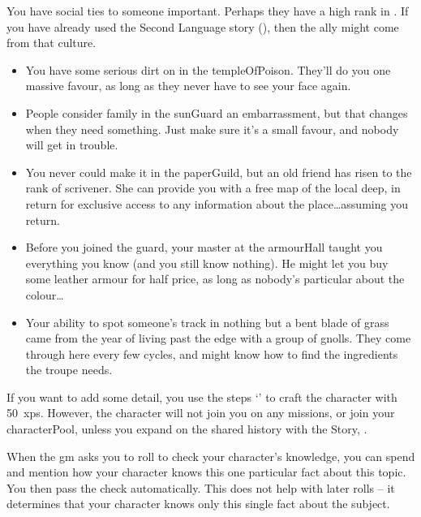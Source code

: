 \begin{multicols}{2}
\label{designCharacter}
You have social ties to someone important.
Perhaps they have a high rank in .
If you have already used the Second Language story (), then the ally might come from that culture.

\begin{itemize}
  \item
  You have some serious dirt on  in the \gls{templeOfPoison}.
  They'll do you one massive favour, as long as they never have to see your face again.
  \item
  People consider family in the \gls{sunGuard} an embarrassment, but that changes when they need something.
  Just make sure it's a small favour, and nobody will get in trouble.
  \item
  You never could make it in the \gls{paperGuild}, but an old friend has risen to the rank of \gls{scrivener}.
  She can provide you with a free map of the local \gls{deep}, in return for exclusive access to any information about the place\ldots assuming you return.
  \item
  Before you joined the \gls{guard}, your master at the \gls{armourHall} taught you everything you know (and you still know nothing).
  He might let you buy some leather armour for half price, as long as nobody's particular about the colour\ldots
  \item
  Your ability to spot someone's track in nothing but a bent blade of grass came from the year of living past the \gls{edge} with a group of gnolls.
  They come through here every few \glspl{cycle}, and might know how to find the \glspl{ingredient} the troupe needs.
\end{itemize}

If you want to add some detail, you use the steps  `' to craft the character with 50~\glspl{xp}.
However, the character will not join you on any missions, or join your \gls{characterPool}, unless you expand on the shared history with the  Story, .

\label{randomFact}
When the \gls{gm} asks you to roll to check your character's knowledge, you can spend  and mention how your character knows this one particular fact about this topic.
You then pass the check automatically.
This does not help with later rolls -- it determines that your character knows only this single fact about the subject.


\end{multicols}
